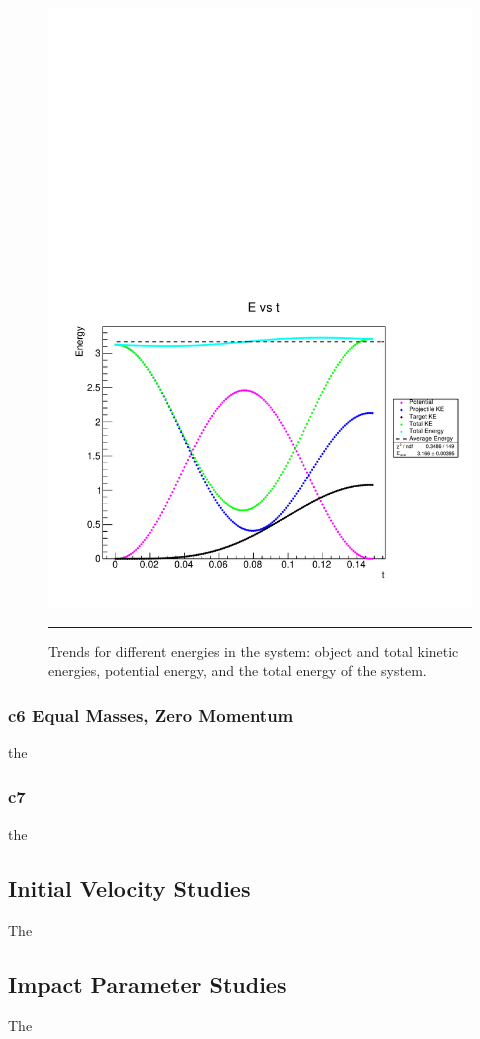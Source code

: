 \documentclass[aps,prl,floatfix,preprint,nofootinbib]{revtex4}
\begin{document}
\begin{figure}
  \includegraphics[width=.8\textwidth]{plots/default/E_vs_t.pdf}
  {\par\nobreak\rule[9pt]{35em}{0.5pt}\vspace{-5mm}}
  \caption{Trends for different energies in the system: object and total kinetic energies, potential energy, and the total energy of the system.}
\end{figure}

\subsubsection{c6 Equal Masses, Zero Momentum}
the

\subsubsection{c7}
the

\subsection{Initial Velocity Studies}
The


\subsection{Impact Parameter Studies}
The
\end{document}
